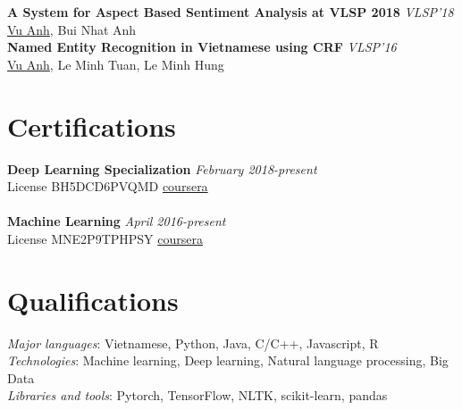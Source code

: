 \documentclass[11pt,a4paper,roman]{article}
\begin{document}
\textbf{A System for Aspect Based Sentiment Analysis at VLSP 2018}
\hfill
\textit{VLSP'18} \\
\underline{Vu Anh}, Bui Nhat Anh
\\

\noindent
\textbf{Named Entity Recognition in Vietnamese using CRF}
\hfill
\textit{VLSP'16} \\
\underline{Vu Anh}, Le Minh Tuan, Le Minh Hung

\section{Certifications}

\textbf{Deep Learning Specialization}
\hfill
\textit{February 2018-present} \\
License BH5DCD6PVQMD
\hfill
\href{https://www.coursera.org/account/accomplishments/verify/BH5DCD6PVQMD}{coursera}
\\\\
\textbf{Machine Learning}
\hfill
\textit{April 2016-present} \\
License MNE2P9TPHPSY
\hfill
\href{https://www.coursera.org/account/accomplishments/verify/MNE2P9TPHPSY}{coursera} 

\section{Qualifications}

\textit{Major languages}: Vietnamese, Python, Java, C/C++, Javascript, R
\\
\textit{Technologies}: Machine learning, Deep learning, Natural language processing, Big Data
\\
\textit{Libraries and tools}: Pytorch, TensorFlow, NLTK, scikit-learn, pandas
\end{document}
